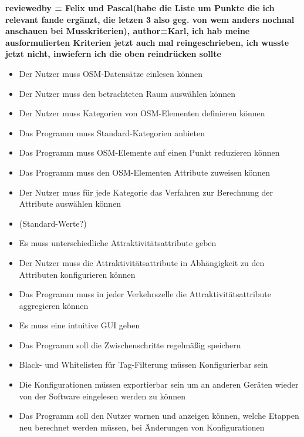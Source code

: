 \documentclass[parskip=full]{scrartcl} %
\begin{document}
\textbf{reviewedby = Felix und Pascal(habe die Liste um Punkte die ich relevant fande ergänzt, die letzen 3 also geg. von wem anders nochnal anschauen bei Musskriterien), author=Karl, ich hab meine ausformulierten Kriterien jetzt auch mal reingeschrieben, ich wusste jetzt nicht, inwiefern ich die oben reindrücken sollte\\}
\begin{itemize}
    \item Der Nutzer muss OSM-Datensätze einlesen können
    \item Der Nutzer muss den betrachteten Raum auswählen können
    \item Der Nutzer muss Kategorien von OSM-Elementen definieren können
    \item Das Programm muss Standard-Kategorien anbieten
    \item Das Programm muss OSM-Elemente auf einen Punkt reduzieren können
    \item Das Programm muss den OSM-Elementen Attribute zuweisen können
    \item Der Nutzer muss für jede Kategorie das Verfahren zur Berechnung der Attribute auswählen können
    \item (Standard-Werte?)
    \item Es muss unterschiedliche Attraktivitätsattribute geben
    \item Der Nutzer muss die Attraktivitätsattribute in Abhängigkeit zu den Attributen konfigurieren können
    \item Das Programm muss in jeder Verkehrszelle die Attraktivitätsattribute aggregieren können
    \item Es muss eine intuitive GUI geben
    \item Das Programm soll die Zwischenschritte regelmäßig speichern
    \item Black- und Whitelisten für Tag-Filterung müssen Konfigurierbar sein
    \item Die Konfigurationen müssen exportierbar sein um an anderen Geräten wieder von der Software eingelesen werden zu können
    \item Das Programm soll den Nutzer warnen und anzeigen können, welche Etappen neu berechnet werden müssen, bei Änderungen von Konfigurationen
\end{itemize}
\end{document}

